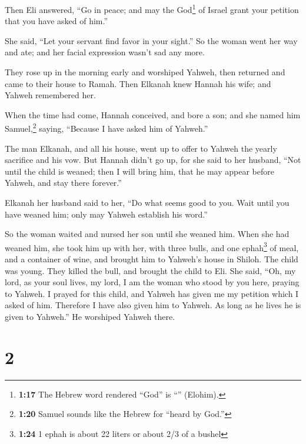  Then Eli answered, ``Go in peace; and may the
God\footnote{\textbf{1:17} The Hebrew word rendered ``God'' is
  ``'' (Elohim).} of Israel grant your petition that you
have asked of him.''

 She said, ``Let your servant find favor in your sight.''
So the woman went her way and ate; and her facial expression wasn't sad
any more.

 They rose up in the morning early and worshiped Yahweh,
then returned and came to their house to Ramah. Then Elkanah knew Hannah
his wife; and Yahweh remembered her.

 When the time had come, Hannah conceived, and bore a
son; and she named him Samuel,\footnote{\textbf{1:20} Samuel sounds like
  the Hebrew for ``heard by God.''} saying, ``Because I have asked him
of Yahweh.''

 The man Elkanah, and all his house, went up to offer to
Yahweh the yearly sacrifice and his vow.  But Hannah
didn't go up, for she said to her husband, ``Not until the child is
weaned; then I will bring him, that he may appear before Yahweh, and
stay there forever.''

 Elkanah her husband said to her, ``Do what seems good to
you. Wait until you have weaned him; only may Yahweh establish his
word.''

So the woman waited and nursed her son until she weaned him.
 When she had weaned him, she took him up with her, with
three bulls, and one ephah\footnote{\textbf{1:24} 1 ephah is about 22
  liters or about 2/3 of a bushel} of meal, and a container of wine, and
brought him to Yahweh's house in Shiloh. The child was young.
 They killed the bull, and brought the child to Eli.
 She said, ``Oh, my lord, as your soul lives, my lord, I
am the woman who stood by you here, praying to Yahweh.  I
prayed for this child, and Yahweh has given me my petition which I asked
of him.  Therefore I have also given him to Yahweh. As
long as he lives he is given to Yahweh.'' He worshiped Yahweh there.

\hypertarget{section-1}{%
\section{2}\label{section-1}}

